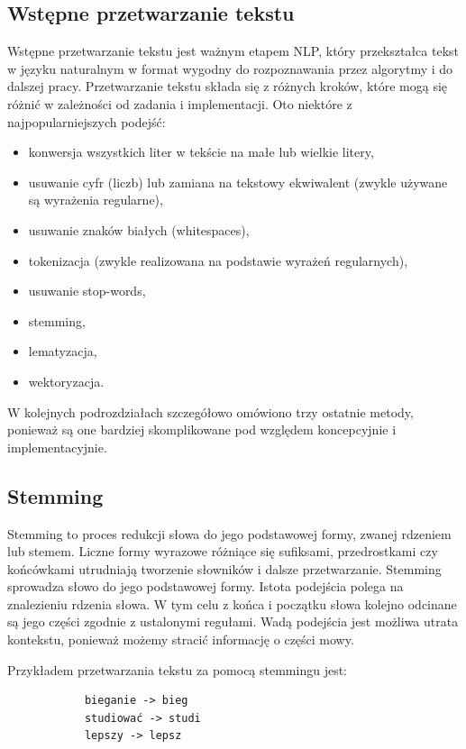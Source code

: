 	\subsection{Wstępne przetwarzanie tekstu}
		Wstępne przetwarzanie tekstu jest ważnym etapem NLP, który przekształca tekst w języku naturalnym w format wygodny do rozpoznawania przez algorytmy i do dalszej pracy. Przetwarzanie tekstu składa się z różnych kroków, które mogą się różnić w zależności od zadania i implementacji. Oto niektóre z najpopularniejszych podejść:
	\begin{itemize}
		\item konwersja wszystkich liter w tekście na małe lub wielkie litery,
		\item usuwanie cyfr (liczb) lub zamiana na tekstowy ekwiwalent (zwykle używane są wyrażenia regularne),
		\item usuwanie znaków białych (whitespaces),
		\item tokenizacja (zwykle realizowana na podstawie wyrażeń regularnych),
		\item usuwanie stop-words,
		\item stemming,
		\item lematyzacja,
		\item wektoryzacja.
	\end{itemize}
	W kolejnych podrozdziałach szczegółowo omówiono trzy ostatnie metody, ponieważ są one bardziej skomplikowane pod względem koncepcyjnie i implementacyjnie.


	\subsection{Stemming}
		 Stemming to proces redukcji słowa do jego podstawowej formy, zwanej rdzeniem lub stemem. Liczne formy wyrazowe różniące się sufiksami, przedrostkami czy końcówkami utrudniają tworzenie słowników i dalsze przetwarzanie. Stemming sprowadza słowo do jego podstawowej formy. Istota podejścia polega na znalezieniu rdzenia słowa. W tym celu z końca i początku słowa kolejno odcinane są jego części zgodnie z ustalonymi regułami. Wadą podejścia jest możliwa utrata kontekstu, ponieważ możemy stracić informację o części mowy.
		 
		 
		Przykładem przetwarzania tekstu za pomocą stemmingu jest:
		 \begin{verbatim}
		 	bieganie -> bieg
		 	studiować -> studi
		 	lepszy -> lepsz
		 \end{verbatim}
		 
		 

